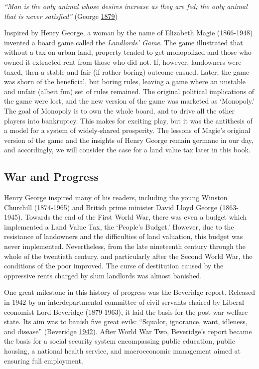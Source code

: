 \documentclass[]{tufte-handout}
\begin{document}
\emph{``Man is the only animal whose desires increase as they are fed;
the only animal that is never satisfied''} (George
\protect\hyperlink{ref-George1879}{1879})

Inspired by Henry George, a woman by the name of Elizabeth Magie
(1866-1948) invented a board game called the \emph{Landlords' Game}. The
game illustrated that without a tax on urban land, property tended to
get monopolized and those who owned it extracted rent from those who did
not. If, however, landowners were taxed, then a stable and fair (if
rather boring) outcome ensued. Later, the game was shorn of the
beneficial, but boring rules, leaving a game where an unstable and
unfair (albeit fun) set of rules remained. The original political
implications of the game were lost, and the new version of the game was
marketed as `Monopoly.' The goal of Monopoly is to own the whole board,
and to drive all the other players into bankruptcy. This makes for
exciting play, but it was the antithesis of a model for a system of
widely-shared prosperity. The lessons of Magie's original version of the
game and the insights of Henry George remain germane in our day, and
accordingly, we will consider the case for a land value tax later in
this book.

\hypertarget{war-and-progress}{%
\subsection{War and Progress}\label{war-and-progress}}

Henry George inspired many of his readers, including the young Winston
Churchill (1874-1965) and British prime minister David Lloyd George
(1863-1945). Towards the end of the First World War, there was even a
budget which implemented a Land Value Tax, the `People's Budget.'
However, due to the resistance of landowners and the difficulties of
land valuation, this budget was never implemented. Nevertheless, from
the late nineteenth century through the whole of the twentieth century,
and particularly after the Second World War, the conditions of the poor
improved. The curse of destitution caused by the oppressive rents
charged by slum landlords was almost banished.

One great milestone in this history of progress was the Beveridge
report. Released in 1942 by an interdepartmental committee of civil
servants chaired by Liberal economist Lord Beveridge (1879-1963), it
laid the basis for the post-war welfare state. Its aim was to banish
five great evils: ``Squalor, ignorance, want, idleness, and disease''
(Beveridge \protect\hyperlink{ref-Beveridge1942}{1942}). After World War
Two, Beveridge's report became the basis for a social security system
encompassing public education, public housing, a national health
service, and macroeconomic management aimed at ensuring full employment.
\end{document}
